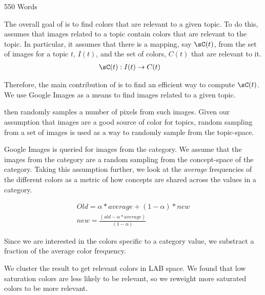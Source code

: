 550 Words

The overall goal of \system is to find colors that are relevant to a given topic. To do this, \system assumes that images related to a topic contain colors that are relevant to the topic. In particular, it assumes that there is a mapping, say $\sC(t)$, from the set of images for a topic $t$, $I(t)$, and the set of colors, $C(t)$ that are relevant to it. 
\begin{align*}
\sC(t) : I(t) &\rightarrow C(t)
\end{align*} 

Therefore, the main contribution of \system is to find an efficient way to compute $\sC(t)$. 
We use Google Images as a means to find images related to a given topic. 

\system then randomly samples a number of pixels from such images. Given our assumption that images are a good source of color for topics, random sampling from a set of images is used as a way to randomly sample from the topic-space.   

Google Images is queried for images from  the category.
We assume that the images from the category are a random sampling from the concept-space of the category. Taking this assumption further, we look at the {\em average} frequencies of the different colors as a metric of how concepts are shared across the values in a category.

\begin{align}
Old = \alpha*average + (1-\alpha)*new \\
  new = \frac{(old - \alpha*average)}{(1-\alpha)} 
\end{align}

Since we are interested in the colors specific to a category value, we substract a fraction of the average color frequency. 

We cluster the result to get relevant colors in LAB space. We found that low saturation colors are less likely to be relevant, 
so we reweight more saturated colors to be more relevant.
